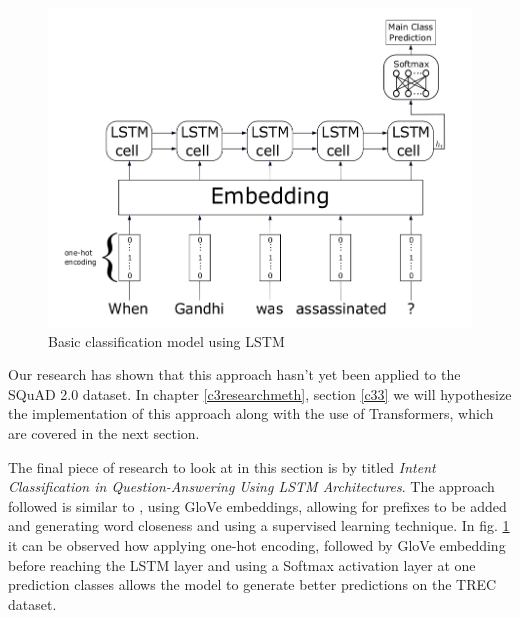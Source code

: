 \documentclass[a4paper,12pt]{report}
\begin{document}
		\begin{figure}[!h]
			\centering
			\includegraphics[scale=0.35]{../images/lstm-intent1.png}
			\caption{Basic classification model using LSTM \citep{lstmintent}}\label{lstmIntent1}
		\end{figure}
	     Our research has shown that this approach hasn't yet been applied to the SQuAD 2.0 dataset. In chapter \ref{c3researchmeth}, section \ref{c33} we will hypothesize the implementation of this approach along with the use of Transformers, which are covered in the next section.

         The final piece of research to look at in this section is by \citep{lstmintent} titled \textit{Intent Classification in Question-Answering Using LSTM Architectures}. The approach followed is similar to \citep{lstmSubilstm}, using GloVe embeddings, allowing for prefixes to be added and generating word closeness and using a supervised learning technique. In fig. \ref{lstmIntent1} it can be observed how applying one-hot encoding, followed by GloVe embedding before reaching the LSTM layer and using a Softmax activation layer at one prediction classes allows the model to generate better predictions on the TREC \citep{trec} dataset.
\end{document}
